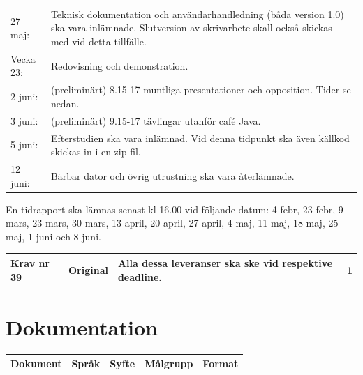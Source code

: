 \documentclass[11pt]{article}
\begin{document}
\begin{flushleft}
\begin{center}
\begin{longtable}{l p{.8\linewidth} }
27 maj: &
Teknisk dokumentation och användarhandledning (båda version 1.0) ska vara inlämnade. Slutversion av skrivarbete skall också skickas med vid detta tillfälle. \\

Vecka 23: &
Redovisning och demonstration.\\

2 juni: &
(preliminärt) 8.15-17 muntliga presentationer och opposition. Tider se nedan. \\

3 juni: &
(preliminärt) 9.15-17 tävlingar utanför café Java. \\

5 juni: &
Efterstudien ska vara inlämnad. Vid denna tidpunkt ska även källkod skickas in i en zip-fil. \\

12 juni: &
Bärbar dator och övrig utrustning ska vara återlämnade.
\end{longtable}
\end{center}
En tidrapport ska lämnas senast kl 16.00 vid följande datum: 4 febr, 23 febr, 9 mars, 23 mars, 30 mars, 13 april, 20 april, 27 april, 4 maj, 11 maj, 18 maj, 25 maj, 1 juni och 8 juni.

\begin{center}
\begin{longtable}{|l|l|p{.70\linewidth}|l|} \hline
Krav nr 39 &
Original &
Alla dessa leveranser ska ske vid respektive deadline. &
1 \\ \hline
\end{longtable}
\end{center}

\pagebreak

\section{Dokumentation}

\begin{center}
\begin{longtable}{|p{.24\linewidth}|p{.08\linewidth}|p{.25\linewidth}|p{.19\linewidth}|p{.1\linewidth}|}\hline
\textbf{Dokument} & \textbf{Språk} & \textbf{Syfte} & \textbf{Målgrupp} & \textbf{Format} \\ \hline


\end{longtable}
\end{center}
\end{flushleft}
\end{document}
